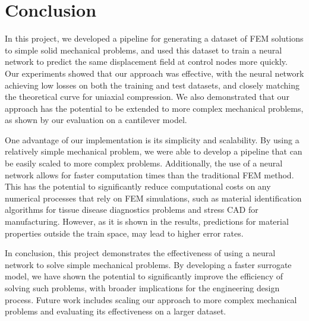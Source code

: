 \documentclass[oneside,a4paper,english,links]{amca}
\begin{document}

\section{Conclusion}
In this project, we developed a pipeline for generating a dataset of FEM solutions to simple solid mechanical problems, and used this dataset to train a neural network to predict the same displacement field at control nodes more quickly.
%
Our experiments showed that our approach was effective, with the neural network achieving low losses on both the training and test datasets, and closely matching the theoretical curve for uniaxial compression. We also demonstrated that our approach has the potential to be extended to more complex mechanical problems, as shown by our evaluation on a cantilever model. 

One advantage of our implementation is its simplicity and scalability. By using a relatively simple mechanical problem, we were able to develop a pipeline that can be easily scaled to more complex problems. Additionally, the use of a neural network allows for faster computation times than the traditional FEM method. This has the potential to significantly reduce computational costs on any numerical processes that rely on FEM simulations, such as material identification algorithms for tissue disease diagnostics problems and stress CAD for manufacturing. However, as it is shown in the results, predictions for material properties outside the train space, may lead to higher error rates. 


In conclusion, this project demonstrates the effectiveness of using a neural network to solve simple mechanical problems. By developing a faster surrogate model, we have shown the potential to significantly improve the efficiency of solving such problems, with broader implications for the engineering design process. Future work includes scaling our approach to more complex mechanical problems and evaluating its effectiveness on a larger dataset.


\end{document}
